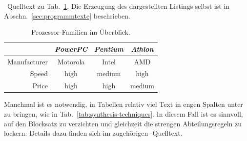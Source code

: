 \begin{program}
\caption{\latex\ Quelltext zu Tab.~\ref{tab:processors}.
Die Erzeugung des dargestellten Listings selbst ist in Abschn.\ \ref{sec:programmtexte} beschrieben.}
\label{prog:processors-source}
%
\begin{LaTeXCode}[numbers=none]
\begin{table}
	\caption{Prozessor-Familien im Überblick.}
	\label{tab:processors}
	\centering
	\setlength{\tabcolsep}{5mm}	%
	\def\arraystretch{1.25}		%
	\begin{tabular}{|r||c|c|c|} 
		\hline
		& \emph{PowerPC} & \emph{Pentium} & \emph{Athlon} \\
		\hline
		\hline
		Manufacturer & Motorola & Intel & AMD \\
		\hline
		Speed & high & medium & high   \\
		\hline
		Price & high & high   & medium \\
		\hline
	\end{tabular}
\end{table}
\end{LaTeXCode}
%
\end{program}

Manchmal ist es notwendig, in Tabellen relativ viel Text in engen Spalten
unter zu bringen, wie in Tab.~\ref{tab:synthesis-techniques}. In diesem Fall
ist es sinnvoll, auf den Blocksatz zu verzichten und gleichzeit die
strengen Abteilungsregeln zu lockern. Details dazu finden sich im zugehörigen
\latex-Quelltext.


